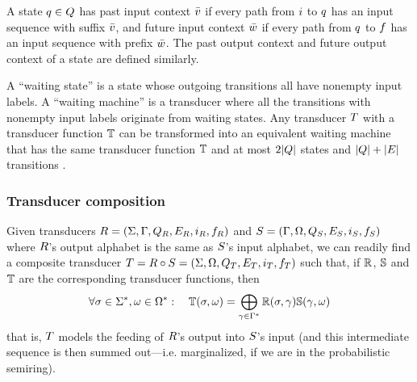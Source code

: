 \documentclass[english]{article}
\begin{document}
A state $q \in Q$ has past input context $\bar{v}$ if every path from $i$ to $q$ has an input sequence with suffix $\bar{v}$,
and future input context $\bar{w}$ if every path from $q$ to $f$ has an input sequence with prefix $\bar{w}$.
The past output context and future output context of a state are defined similarly.

A ``waiting state'' is a state whose outgoing transitions all have nonempty input labels.
A ``waiting machine'' is a transducer where all the transitions with nonempty input labels
originate from waiting states.
Any transducer $T$ with a transducer function $\mathbb{T}$
can be transformed into an equivalent waiting machine
that has the same transducer function $\mathbb{T}$ and
at most $2|Q|$ states and $|Q|+|E|$ transitions
\cite{WestessonEtAlArxiv2012}.

\subsubsection{Transducer composition}

Given transducers
 $R = (\Sigma, \Gamma, Q_{R}, E_{R}, i_{R}, f_{R})$ and
 $S = (\Gamma, \Omega, Q_{S}, E_{S}, i_{S}, f_{S})$
where $R$'s output alphabet is the same as $S$'s input alphabet,
we can readily find a composite transducer
 $T = R \circ S = (\Sigma, \Omega, Q_{T}, E_{T}, i_{T}, f_{T})$
such that, if $\mathbb{R}$, $\mathbb{S}$ and $\mathbb{T}$ are the corresponding transducer functions,
then
\[
\forall \sigma \in {\Sigma}^{\ast}, \omega \in {\Omega}^{\ast}:
\quad
\mathbb{T}(\sigma,\omega) = \bigoplus_{\gamma \in {\Gamma}^{\ast}} \mathbb{R}(\sigma,\gamma) \mathbb{S}(\gamma,\omega)
\]
that is, $T$ models the feeding of $R$'s output into $S$'s input
(and this intermediate sequence is then summed out---i.e. marginalized, if we are in the probabilistic semiring).
\end{document}

